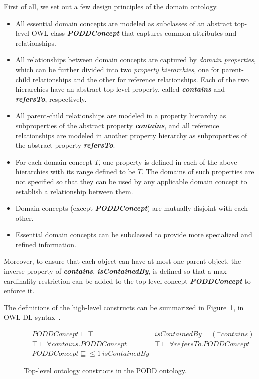 \documentclass{elsarticle}
\begin{document}
First of all, we set out a few design principles of
the domain ontology.
\begin{itemize}
\item All essential domain concepts are modeled as subclasses of
an abstract top-level OWL class \textbf{\emph{PODDConcept}} that
captures common attributes and relationships.

\item All relationships between domain concepts are captured by
\emph{domain properties}, which can be further divided into two
\emph{property hierarchies}, one for parent-child relationships
and the other for reference relationships. Each of the two
hierarchies have an abstract top-level property, called
\textbf{\emph{contains}} and \textbf{\emph{refersTo}}, respectively.

\item All parent-child relationships are
modeled in a property hierarchy as subproperties of the abstract
property \textbf{\emph{contains}}, and all reference relationships
are modeled in another property hierarchy as subproperties of the
abstract property \textbf{\emph{refersTo}}.

\item For each domain concept $T$, one property is defined in each
of the above hierarchies with its range defined to be $T$.
The domains of such properties are not specified so that
they can be used by any applicable domain concept to establish
a relationship between them.

\item Domain concepts (except \textbf{\emph{PODDConcept}})
are mutually disjoint with each other.

\item Essential domain concepts can be subclassed to provide more
specialized and refined information.
\end{itemize}

Moreover, to ensure that each object can have at most one parent object,
the inverse property of \textbf{\emph{contains}},
\textbf{\emph{isContainedBy}}, is defined so that a max cardinality
restriction can be added to the top-level concept \textbf{\emph{PODDConcept}}
to enforce it.

The definitions of the high-level constructs can be summarized
in Figure~\ref{fig:top}, in OWL DL syntax~\cite{hoph03a}.

\vspace{-8pt}
\begin{figure}[htb]
\small\centering
\begin{align*}
&PODDConcept \sqsubseteq \top & isContainedBy = (^-contains)\\
&\top \sqsubseteq \forall contains. PODDConcept
&\top \sqsubseteq \forall refersTo. PODDConcept\\
&PODDConcept \sqsubseteq \leq 1~ isContainedBy
\end{align*}

\vspace{-8pt}
\caption{Top-level ontology constructs in the PODD ontology.}\label{fig:top}
\end{figure}
\end{document}
